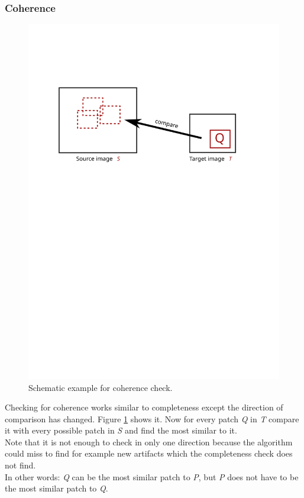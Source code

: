 \subsubsection*{Coherence}
\begin{figure}[h]
\centering
\includegraphics[scale=0.65]{img/coherence}
\caption[Coherence]{Schematic example for coherence check.}
\label{fig:Coherence}
\end{figure}

Checking for coherence works similar to completeness except the direction of comparison has changed. Figure \ref{fig:Coherence} shows it. Now for every patch \textit{Q} in \textit{T} compare it with every possible patch in \textit{S} and find the most similar to it.\\
Note that it is not enough to check in only one direction because the algorithm could miss to find for example new artifacts which the completeness check does not find.\\
In other words: \textit{Q} can be the most similar patch to \textit{P}, but \textit{P} does not have to be the most similar patch to \textit{Q}.

